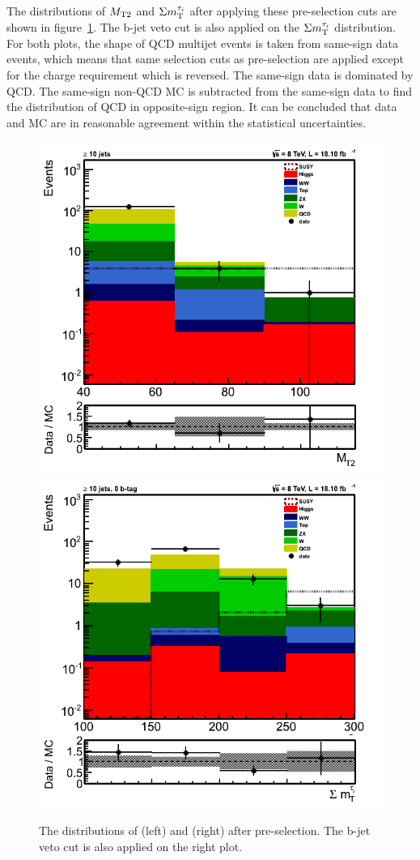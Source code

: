 The distributions of ${M_{\rm T2}}$ and $\Sigma m_{\rm T}^{\tau_i}$ after applying these pre-selection cuts are shown in figure~\ref{fig:comparison}.
The b-jet veto cut is also applied on the $\Sigma m_{\rm T}^{\tau_i}$ distribution. For both plots, the shape of QCD multijet events
is taken from same-sign data events, which means that same selection cuts as pre-selection are applied except for the charge
requirement which is reversed. The same-sign data is dominated by QCD. The same-sign non-QCD MC is subtracted from the same-sign data to
find the distribution of QCD in opposite-sign region.   
 It can be concluded that data and MC are in reasonable agreement within the statistical uncertainties.
\begin{figure}[!Hhtb]
\centering
\includegraphics[angle=0,scale=0.35]{TauTauFigs/MT2_SSQCD_dataunblinding.png}
\includegraphics[angle=0,scale=0.35]{TauTauFigs/SumMT_SSQCD_dataunblinding.png} \\
\caption{The distributions of \mttwo (left) and \SumMT (right) after pre-selection. The b-jet veto cut is also applied on the right plot.}
\label{fig:comparison}
\end{figure}
